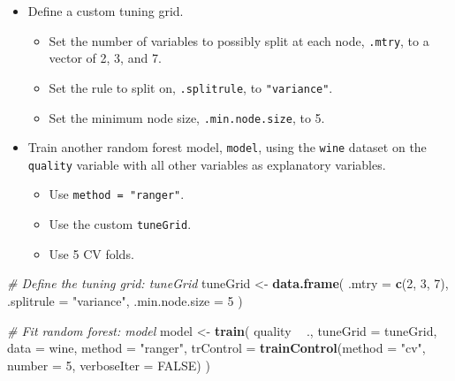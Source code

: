 \documentclass[]{book}
\newenvironment{Shaded}{\begin{snugshade}}{\end{snugshade}}
\newcommand{\KeywordTok}[1]{\textcolor[rgb]{0.13,0.29,0.53}{\textbf{#1}}}
\newcommand{\DataTypeTok}[1]{\textcolor[rgb]{0.13,0.29,0.53}{#1}}
\newcommand{\DecValTok}[1]{\textcolor[rgb]{0.00,0.00,0.81}{#1}}
\newcommand{\StringTok}[1]{\textcolor[rgb]{0.31,0.60,0.02}{#1}}
\newcommand{\CommentTok}[1]{\textcolor[rgb]{0.56,0.35,0.01}{\textit{#1}}}
\newcommand{\OtherTok}[1]{\textcolor[rgb]{0.56,0.35,0.01}{#1}}
\newcommand{\OperatorTok}[1]{\textcolor[rgb]{0.81,0.36,0.00}{\textbf{#1}}}
\newcommand{\NormalTok}[1]{#1}
\begin{document}
\begin{itemize}
\item
  Define a custom tuning grid.

  \begin{itemize}
  \item
    Set the number of variables to possibly split at each node,
    \texttt{.mtry}, to a vector of 2, 3, and 7.
  \item
    Set the rule to split on, \texttt{.splitrule}, to
    \texttt{"variance"}.
  \item
    Set the minimum node size, \texttt{.min.node.size}, to 5.
  \end{itemize}
\item
  Train another random forest model, \texttt{model}, using the
  \texttt{wine} dataset on the \texttt{quality} variable with all other
  variables as explanatory variables.

  \begin{itemize}
  \item
    Use \texttt{method\ =\ "ranger"}.
  \item
    Use the custom \texttt{tuneGrid}.
  \item
    Use 5 CV folds.
  \end{itemize}
\end{itemize}

\begin{Shaded}
\begin{Highlighting}[]
\CommentTok{# Define the tuning grid: tuneGrid}
\NormalTok{tuneGrid <-}\StringTok{ }\KeywordTok{data.frame}\NormalTok{(}
  \DataTypeTok{.mtry =} \KeywordTok{c}\NormalTok{(}\DecValTok{2}\NormalTok{, }\DecValTok{3}\NormalTok{, }\DecValTok{7}\NormalTok{),}
  \DataTypeTok{.splitrule =} \StringTok{"variance"}\NormalTok{,}
  \DataTypeTok{.min.node.size =} \DecValTok{5}
\NormalTok{)}

\CommentTok{# Fit random forest: model}
\NormalTok{model <-}\StringTok{ }\KeywordTok{train}\NormalTok{(}
\NormalTok{  quality }\OperatorTok{~}\StringTok{ }\NormalTok{.,}
  \DataTypeTok{tuneGrid =}\NormalTok{ tuneGrid,}
  \DataTypeTok{data =}\NormalTok{ wine, }
  \DataTypeTok{method =} \StringTok{"ranger"}\NormalTok{,}
  \DataTypeTok{trControl =} \KeywordTok{trainControl}\NormalTok{(}\DataTypeTok{method =} \StringTok{"cv"}\NormalTok{, }
                           \DataTypeTok{number =} \DecValTok{5}\NormalTok{, }
                           \DataTypeTok{verboseIter =} \OtherTok{FALSE}\NormalTok{)}
\NormalTok{)}
\end{Highlighting}
\end{Shaded}
\end{document}
